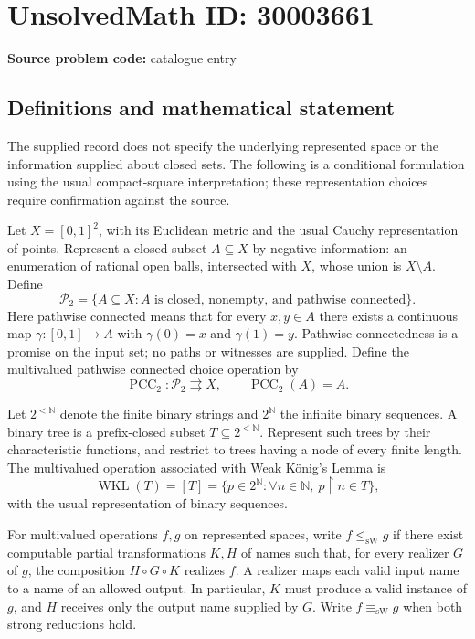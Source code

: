 \documentclass[11pt]{article}
\newcommand{\N}{\mathbb{N}}
\begin{document}
\section*{UnsolvedMath ID: 30003661}
\textbf{Source problem code:} catalogue entry
\subsection{Definitions and mathematical statement}
The supplied record does not specify the underlying represented space or the information supplied about closed sets. The following is a conditional formulation using the usual compact-square interpretation; these representation choices require confirmation against the source.

Let \(X=[0,1]^2\), with its Euclidean metric and the usual Cauchy representation of points. Represent a closed subset \(A\subseteq X\) by negative information: an enumeration of rational open balls, intersected with \(X\), whose union is \(X\setminus A\). Define
\[
\mathcal P_2=\{A\subseteq X:A\text{ is closed, nonempty, and pathwise connected}\}.
\]
Here pathwise connected means that for every \(x,y\in A\) there exists a continuous map \(\gamma:[0,1]\to A\) with \(\gamma(0)=x\) and \(\gamma(1)=y\). Pathwise connectedness is a promise on the input set; no paths or witnesses are supplied. Define the multivalued pathwise connected choice operation by
\[
\operatorname{PCC}_2:\mathcal P_2\rightrightarrows X,
\qquad \operatorname{PCC}_2(A)=A.
\]

Let \(2^{<\N}\) denote the finite binary strings and \(2^{\N}\) the infinite binary sequences. A binary tree is a prefix-closed subset \(T\subseteq 2^{<\N}\). Represent such trees by their characteristic functions, and restrict to trees having a node of every finite length. The multivalued operation associated with Weak K\"onig's Lemma is
\[
\operatorname{WKL}(T)=[T]
=\{p\in 2^{\N}:\forall n\in\N,\ p\mathbin{\upharpoonright}n\in T\},
\]
with the usual representation of binary sequences.

For multivalued operations \(f,g\) on represented spaces, write \(f\leq_{\mathrm{sW}}g\) if there exist computable partial transformations \(K,H\) of names such that, for every realizer \(G\) of \(g\), the composition \(H\circ G\circ K\) realizes \(f\). A realizer maps each valid input name to a name of an allowed output. In particular, \(K\) must produce a valid instance of \(g\), and \(H\) receives only the output name supplied by \(G\). Write \(f\equiv_{\mathrm{sW}}g\) when both strong reductions hold.
\end{document}
